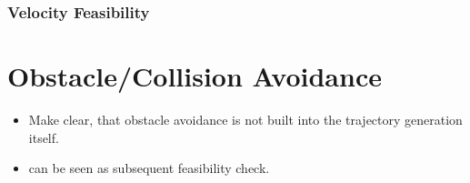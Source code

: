 \subsubsection{Velocity Feasibility}


\section{Obstacle/Collision Avoidance}

\begin{itemize}
	\color{red}
	\item Make clear, that obstacle avoidance is not built into the trajectory generation itself. 
	\item can be seen as subsequent feasibility check. 
\end{itemize}

